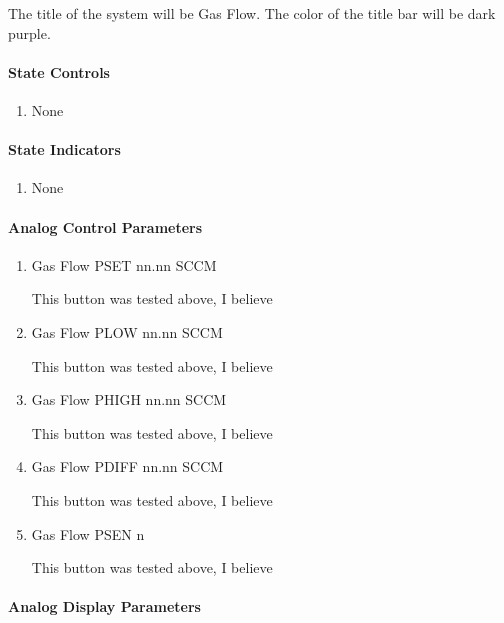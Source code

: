 \documentclass[11pt]{book}		%
\begin{document}
The title of the system will be Gas Flow.  The color of the title bar will be dark purple.

\paragraph{State Controls}

\begin{enumerate}
\item None
\end{enumerate}

\paragraph{State Indicators}

\begin{enumerate}
 \item None
\end{enumerate}


\paragraph{Analog Control Parameters}

\begin{enumerate}
 \item Gas Flow PSET   nn.nn SCCM

\color{red}
This button was tested above, I believe
\color{black}

 \item Gas Flow PLOW   nn.nn SCCM

\color{red}
This button was tested above, I believe
\color{black}

 \item Gas Flow PHIGH  nn.nn SCCM

\color{red}
This button was tested above, I believe
\color{black}

 \item Gas Flow PDIFF  nn.nn SCCM

\color{red}
This button was tested above, I believe
\color{black}

 \item Gas Flow PSEN   n

\color{red}
This button was tested above, I believe
\color{black}

\end{enumerate}

\paragraph{Analog Display Parameters}
\end{document}
